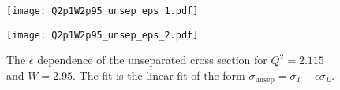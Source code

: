 \begin{figure}
  \centering
  \begin{minipage}[b]{0.48\linewidth}
    \texttt{[image: Q2p1W2p95\_unsep\_eps\_1.pdf]}
  \end{minipage}
  \hfill
  \begin{minipage}[b]{0.48\linewidth}
    \texttt{[image: Q2p1W2p95\_unsep\_eps\_2.pdf]}
  \end{minipage}
  \caption{The $\epsilon$ dependence of the unseparated cross section for $Q^2=2.115$ and $W=2.95$. The fit is the linear fit of the form $\sigma_{\mathrm{unsep}}=\sigma_T+\epsilon\sigma_L$.}
  \label{fig:Q2p1W2p95_unsep_eps}
\end{figure}

